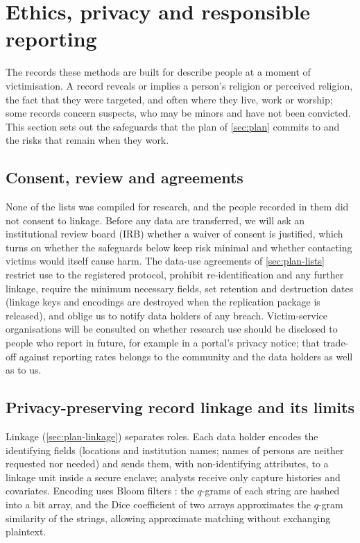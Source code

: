 \section{Ethics, privacy and responsible reporting}\label{sec:ethics}

The records these methods are built for describe people at a moment of victimisation. A record reveals or implies a person's religion or perceived religion, the fact that they were targeted, and often where they live, work or worship; some records concern suspects, who may be minors and have not been convicted. This section sets out the safeguards that the plan of \cref{sec:plan} commits to and the risks that remain when they work.

\subsection{Consent, review and agreements}\label{sec:ethics-review}

None of the lists was compiled for research, and the people recorded in them did not consent to linkage. Before any data are transferred, we will ask an institutional review board (IRB) whether a waiver of consent is justified, which turns on whether the safeguards below keep risk minimal and whether contacting victims would itself cause harm. The data-use agreements of \cref{sec:plan-lists} restrict use to the registered protocol, prohibit re-identification and any further linkage, require the minimum necessary fields, set retention and destruction dates (linkage keys and encodings are destroyed when the replication package is released), and oblige us to notify data holders of any breach. Victim-service organisations will be consulted on whether research use should be disclosed to people who report in future, for example in a portal's privacy notice; that trade-off against reporting rates belongs to the community and the data holders as well as to us.

\subsection{Privacy-preserving record linkage and its limits}\label{sec:ethics-pprl}

Linkage (\cref{sec:plan-linkage}) separates roles. Each data holder encodes the identifying fields (locations and institution names; names of persons are neither requested nor needed) and sends them, with non-identifying attributes, to a linkage unit inside a secure enclave; analysts receive only capture histories and covariates. Encoding uses Bloom filters \citep{schnell2009}: the $q$-grams of each string are hashed into a bit array, and the Dice coefficient of two arrays approximates the $q$-gram similarity of the strings, allowing approximate matching without exchanging plaintext.

